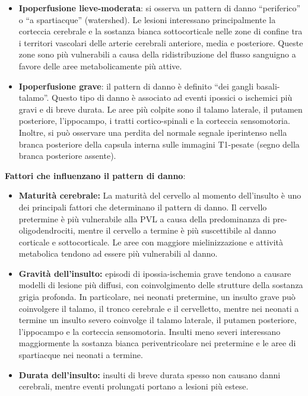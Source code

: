 \begin{itemize}
	\tightlist
	\item
	\textbf{Ipoperfusione lieve-moderata}: si osserva un pattern di danno ``periferico'' o ``a spartiacque'' (watershed). Le lesioni interessano principalmente la corteccia cerebrale e la sostanza bianca sottocorticale nelle zone di confine tra i territori vascolari delle arterie cerebrali anteriore, media e posteriore. Queste zone sono più vulnerabili a causa della ridistribuzione del flusso sanguigno a favore delle aree metabolicamente più attive.
	\item
	\textbf{Ipoperfusione grave}: il pattern di danno è definito ``dei gangli basali-talamo''. Questo tipo di danno è associato ad eventi ipossici o ischemici più gravi e di breve durata. Le aree più colpite sono il talamo laterale, il putamen posteriore, l'ippocampo, i tratti cortico-spinali e la corteccia sensomotoria. Inoltre, si può osservare una perdita del normale segnale iperintenso nella branca posteriore della capsula interna sulle immagini T1-pesate (segno della branca posteriore assente).
\end{itemize}

\textbf{Fattori che influenzano il pattern di danno}:

\begin{itemize}
	\tightlist
	\item
	\textbf{Maturità cerebrale:} La maturità del cervello al momento dell'insulto è uno dei principali fattori che determinano il pattern di danno. Il cervello pretermine è più vulnerabile alla PVL a causa della predominanza di pre-oligodendrociti, mentre il cervello a termine è più suscettibile al danno corticale e sottocorticale. Le aree con maggiore mielinizzazione e attività metabolica tendono ad essere più vulnerabili al danno.
	\item
	\textbf{Gravità dell'insulto:} episodi di ipossia-ischemia grave tendono a causare modelli di lesione più diffusi, con coinvolgimento delle strutture della sostanza grigia profonda. In particolare, nei neonati pretermine, un insulto grave può coinvolgere il talamo, il tronco cerebrale e il cervelletto, mentre nei neonati a termine un insulto severo coinvolge il talamo laterale, il putamen posteriore, l'ippocampo e la corteccia sensomotoria. Insulti meno severi interessano maggiormente la sostanza bianca periventricolare nei pretermine e le aree di spartiacque nei neonati a termine.
	\item
	\textbf{Durata dell'insulto:} insulti di breve durata spesso non causano danni cerebrali, mentre eventi prolungati portano a lesioni più estese.
\end{itemize}

